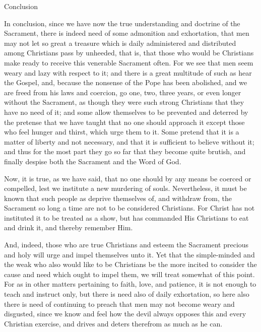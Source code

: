 Conclusion

In conclusion, since we have now the true understanding and doctrine of
the Sacrament, there is indeed need of some admonition and exhortation,
that men may not let so great a treasure which is daily administered
and distributed among Christians pass by unheeded, that is, that those
who would be Christians make ready to receive this venerable Sacrament
often. For we see that men seem weary and lazy with respect to it; and
there is a great multitude of such as hear the Gospel, and, because the
nonsense of the Pope has been abolished, and we are freed from his laws
and coercion, go one, two, three years, or even longer without the
Sacrament, as though they were such strong Christians that they have no
need of it; and some allow themselves to be prevented and deterred by
the pretense that we have taught that no one should approach it except
those who feel hunger and thirst, which urge them to it. Some pretend
that it is a matter of liberty and not necessary, and that it is
sufficient to believe without it; and thus for the most part they go so
far that they become quite brutish, and finally despise both the
Sacrament and the Word of God.

Now, it is true, as we have said, that no one should by any means be
coerced or compelled, lest we institute a new murdering of souls.
Nevertheless, it must be known that such people as deprive themselves
of, and withdraw from, the Sacrament so long a time are not to be
considered Christians. For Christ has not instituted it to be treated
as a show, but has commanded His Christians to eat and drink it, and
thereby remember Him.

And, indeed, those who are true Christians and esteem the Sacrament
precious and holy will urge and impel themselves unto it. Yet that the
simple-minded and the weak who also would like to be Christians be the
more incited to consider the cause and need which ought to impel them,
we will treat somewhat of this point. For as in other matters
pertaining to faith, love, and patience, it is not enough to teach and
instruct only, but there is need also of daily exhortation, so here
also there is need of continuing to preach that men may not become
weary and disgusted, since we know and feel how the devil always
opposes this and every Christian exercise, and drives and deters
therefrom as much as he can.

